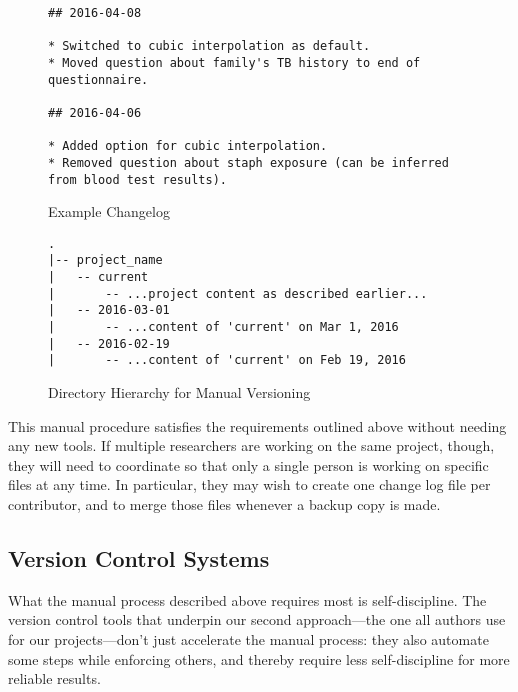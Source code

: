 \documentclass[10pt]{article}
\begin{document}
\begin{figure}
\begin{verbatim}
## 2016-04-08

* Switched to cubic interpolation as default.
* Moved question about family's TB history to end of questionnaire.

## 2016-04-06

* Added option for cubic interpolation.
* Removed question about staph exposure (can be inferred from blood test results).
\end{verbatim}
\caption{Example Changelog}
\label{fig:changelog}
\end{figure}

\begin{figure}
\begin{verbatim}
.
|-- project_name
|   -- current
|       -- ...project content as described earlier...
|   -- 2016-03-01
|       -- ...content of 'current' on Mar 1, 2016
|   -- 2016-02-19
|       -- ...content of 'current' on Feb 19, 2016
\end{verbatim}
\caption{Directory Hierarchy for Manual Versioning}
\label{fig:manual}
\end{figure}

This manual procedure satisfies the requirements outlined above
without needing any new tools. If multiple researchers are working on
the same project, though, they will need to coordinate so that only a
single person is working on specific files at any time. In particular,
they may wish to create one change log file per contributor, and to
merge those files whenever a backup copy is made. 

\subsection*{Version Control Systems}

What the manual process described above requires most is
self-discipline. The version control tools that underpin our second
approach---the one all authors use for our projects---don't just
accelerate the manual process: they also automate some steps while
enforcing others, and thereby require less self-discipline for more
reliable results.
\end{document}
